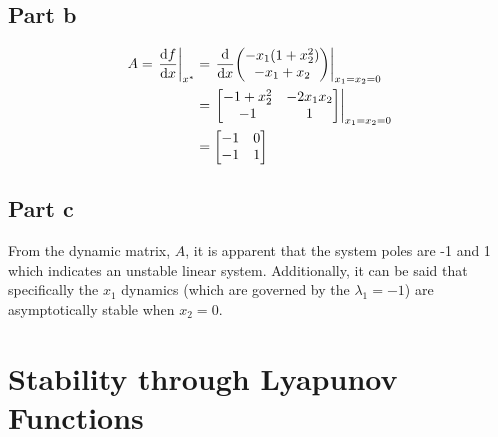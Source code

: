 \documentclass[]{article}
\begin{document}
\subsection{Part b}
\begin{align*}
	A = \eval{\dv{f}{x}}_{x^*} &= \eval{\dv{x} \mqty(-x_1 (1 + x_2^2)\\ -x_1 + x_2)}_{x_1=x_2=0}\\
	&= \eval{\mqty[-1 + x_2^2 & -2 x_1 x_2\\ -1 & 1]}_{x_1=x_2=0}\\
	&= \mqty[-1 & 0\\ -1 &1]
\end{align*}

\subsection{Part c}
From the dynamic matrix, $A$, it is apparent that the system poles are -1 and 1 which indicates an unstable linear system. Additionally, it can be said that specifically the $x_1$ dynamics (which are governed by the $\lambda_1 = -1$) are asymptotically stable when $x_2 = 0$.

\newpage
\section*{Stability through Lyapunov Functions}








	
\end{document}
